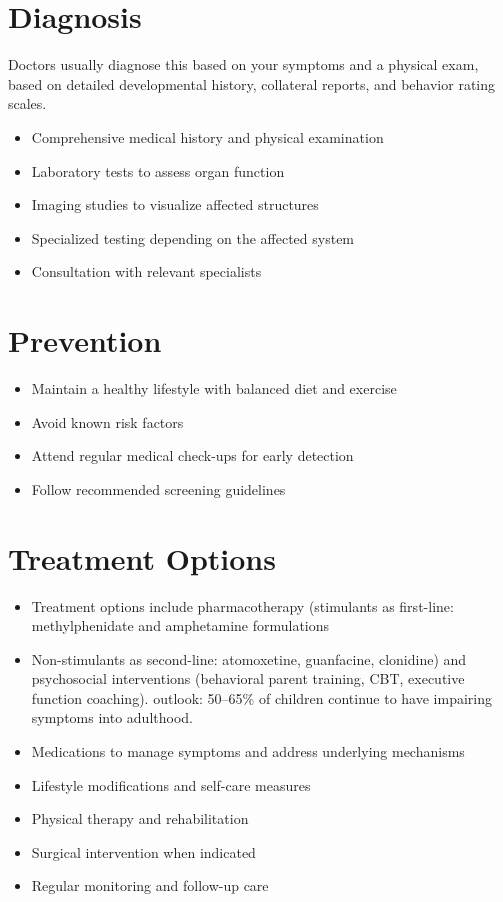 \section{Diagnosis}
Doctors usually diagnose this based on your symptoms and a physical exam, based on detailed developmental history, collateral reports, and behavior rating scales.

\begin{itemize}[noitemsep]
  \item Comprehensive medical history and physical examination
  \item Laboratory tests to assess organ function
  \item Imaging studies to visualize affected structures
  \item Specialized testing depending on the affected system
  \item Consultation with relevant specialists
\end{itemize}
\section{Prevention}
\begin{itemize}[noitemsep]
  \item Maintain a healthy lifestyle with balanced diet and exercise
  \item Avoid known risk factors
  \item Attend regular medical check-ups for early detection
  \item Follow recommended screening guidelines
\end{itemize}
\section{Treatment Options}
\begin{itemize}[noitemsep]
  \item Treatment options include pharmacotherapy (stimulants as first-line: methylphenidate and amphetamine formulations
  \item Non-stimulants as second-line: atomoxetine, guanfacine, clonidine) and psychosocial interventions (behavioral parent training, CBT, executive function coaching). outlook: 50--65\% of children continue to have impairing symptoms into adulthood.
  \item Medications to manage symptoms and address underlying mechanisms
  \item Lifestyle modifications and self-care measures
  \item Physical therapy and rehabilitation
  \item Surgical intervention when indicated
  \item Regular monitoring and follow-up care
\end{itemize}
